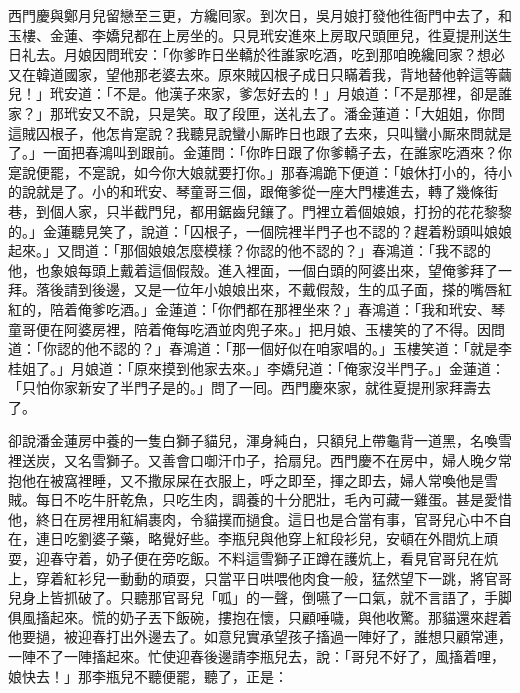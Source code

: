 西門慶與鄭月兒留戀至三更，方纔囘家。到次日，吳月娘打發他徃衙門中去了，和玉樓、金蓮、李嬌兒都在上房坐的。只見玳安進來上房取尺頭匣兒，徃夏提刑送生日礼去。月娘因問玳安：「你爹昨日坐轎於徃誰家吃酒，吃到那咱晚纔囘家？想必又在韓道國家，望他那老婆去來。原來賊囚根子成日只瞞着我，背地替他幹這等繭兒！」{}玳安道：「不是。他漢子來家，爹怎好去的！」月娘道：「不是那裡，卻是誰家？」那玳安又不說，只是笑。取了段匣，送礼去了。潘金蓮道：「大姐姐，你問這賊囚根子，他怎肯寔說？我聽見說蠻小厮昨日也跟了去來，只叫蠻小厮來問就是了。」一面把春鴻叫到跟前。金蓮問：「你昨日跟了你爹轎子去，在誰家吃酒來？你寔說便罷，不寔說，如今你大娘就要打你。」那春鴻跪下便道：「娘休打小的，待小的說就是了。小的和玳安、琴童哥三個，跟俺爹從一座大門樓進去，轉了幾條街巷，到個人家，只半截門兒，都用鋸齒兒鑲了。門裡立着個娘娘，打扮的花花黎黎的。」金蓮聽見笑了，說道：「囚根子，一個院裡半門子也不認的？趕着粉頭叫娘娘起來。」又問道：「那個娘娘怎麼模樣？你認的他不認的？」春鴻道：「我不認的他，也象娘每頭上戴着這個假殼。進入裡面，一個白頭的阿婆出來，望俺爹拜了一拜。落後請到後邊，又是一位年小娘娘出來，不戴假殼，生的瓜子面，搽的嘴唇紅紅的，陪着俺爹吃酒。」金蓮道：「你們都在那裡坐來？」春鴻道：「我和玳安、琴童哥便在阿婆房裡，陪着俺每吃酒並肉兜子來。」把月娘、玉樓笑的了不得。因問道：「你認的他不認的？」春鴻道：「那一個好似在咱家唱的。」{}玉樓笑道：「就是李桂姐了。」月娘道：「原來摸到他家去來。」{}李嬌兒道：「俺家沒半門子。」金蓮道：「只怕你家新安了半門子是的。」問了一囘。西門慶來家，就徃夏提刑家拜壽去了。

卻說潘金蓮房中養的一隻白獅子貓兒，渾身純白，只額兒上帶龜背一道黑，名喚雪裡送炭，又名雪獅子。又善會口啣汗巾子，拾扇兒。西門慶不在房中，婦人晚夕常抱他在被窩裡睡，又不撒尿屎在衣服上，呼之即至，揮之即去，婦人常喚他是雪賊。每日不吃牛肝乾魚，只吃生肉，調養的十分肥壯，毛內可藏一雞蛋。甚是愛惜他，終日在房裡用紅絹裹肉，令貓撲而撾食。這日也是合當有事，官哥兒心中不自在，連日吃劉婆子藥，略覺好些。李瓶兒與他穿上紅段衫兒，安頓在外間炕上頑耍，迎春守着，奶子便在旁吃飯。不料這雪獅子正蹲在護炕上，看見官哥兒在炕上，穿着紅衫兒一動動的頑耍，只當平日哄喂他肉食一般，猛然望下一跳，將官哥兒身上皆抓破了。只聽那官哥兒「呱」的一聲，倒嚥了一口氣，就不言語了，手脚俱風搐起來。慌的奶子丟下飯碗，摟抱在懷，只顧唾噦，與他收驚。那貓還來趕着他要撾，被迎春打出外邊去了。如意兒實承望孩子搐過一陣好了，誰想只顧常連，一陣不了一陣搐起來。忙使迎春後邊請李瓶兒去，說：「哥兒不好了，風搐着哩，娘快去！」那李瓶兒不聽便罷，聽了，正是：

